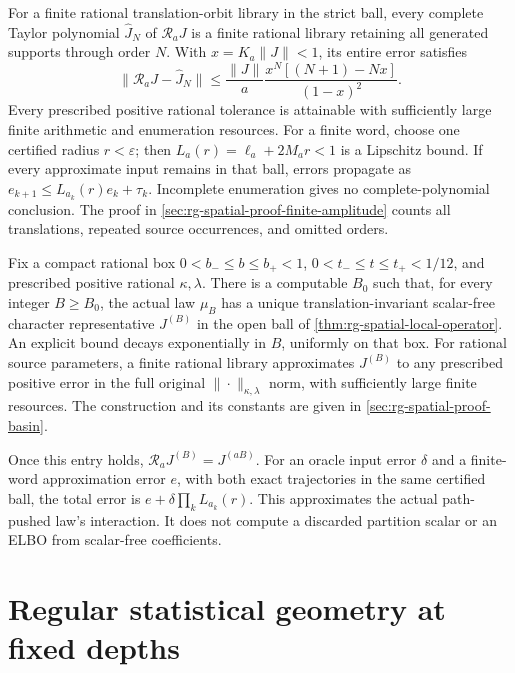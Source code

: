 For a finite rational translation-orbit library in the strict ball, every
complete Taylor polynomial \(\widehat J_N\) of \(\mathcal R_aJ\) is a finite
rational library retaining all generated supports through order \(N\). With
\(x=K_a\|J\|<1\), its entire error satisfies
\begin{equation}
 \|\mathcal R_aJ-\widehat J_N\|
 \le\frac{\|J\|}{a}
       \frac{x^N[(N+1)-Nx]}{(1-x)^2}.
 \label{eq:rg-spatial-taylor-tail}
\end{equation}
Every prescribed positive rational tolerance is attainable with sufficiently
large finite arithmetic and enumeration resources. For a finite word, choose
one certified radius \(r<\varepsilon\); then
\(L_a(r)=\ell_a+2M_ar<1\) is a Lipschitz bound. If every approximate input
remains in that ball, errors propagate as
\(e_{k+1}\le L_{a_k}(r)e_k+\tau_k\). Incomplete enumeration gives no
complete-polynomial conclusion. The proof in
\cref{sec:rg-spatial-proof-finite-amplitude} counts all translations,
repeated source occurrences, and omitted orders. 

Fix a compact rational box
\(0<b_-\le b\le b_+<1\), \(0<t_-\le t\le t_+<1/12\), and prescribed
positive rational \(\kappa,\lambda\). There is a computable \(B_0\) such
that, for every integer \(B\ge B_0\), the actual law \(\mu_B\) has a unique
translation-invariant scalar-free character representative \(J^{(B)}\)
in the open ball of \cref{thm:rg-spatial-local-operator}. An explicit bound
decays exponentially in \(B\), uniformly on that box. For rational source
parameters, a finite rational library approximates \(J^{(B)}\) to any
prescribed positive error in the full original
\(\|\cdot\|_{\kappa,\lambda}\) norm, with sufficiently large finite
resources. The construction and its constants are given in
\cref{sec:rg-spatial-proof-basin}. 

Once this entry holds, \(\mathcal R_aJ^{(B)}=J^{(aB)}\). For an oracle input
error \(\delta\) and a finite-word approximation error \(e\), with both
exact trajectories in the same certified ball, the total error is
\(e+\delta\prod_kL_{a_k}(r)\). This approximates the actual path-pushed
law's interaction. It does not compute a discarded partition scalar or an
ELBO from scalar-free coefficients. 

\section{Regular statistical geometry at fixed depths}
\label{sec:rg-spatial-fisher}

